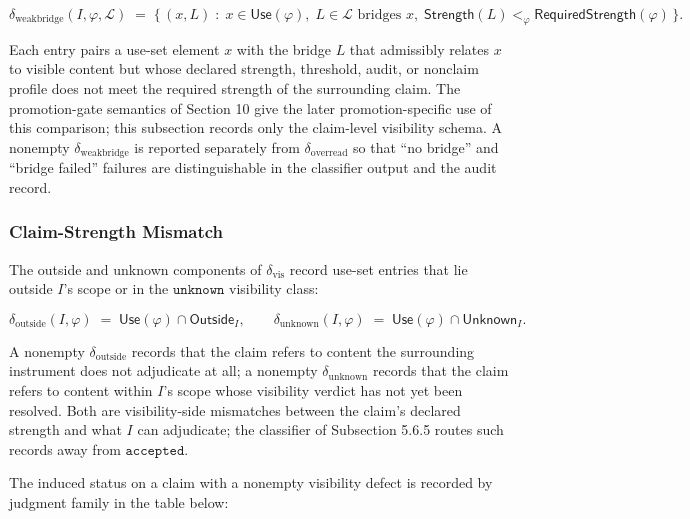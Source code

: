 \documentclass[11pt]{article}
\theoremstyle{definition}
\begin{document}
\[
\delta_{\mathrm{weakbridge}}(I,\varphi,\mathcal L)\;=\;\{\,(x,L)\;:\;x\in\mathsf{Use}(\varphi),\;L\in\mathcal L\text{ bridges }x,\;\mathsf{Strength}(L)<_{\varphi}\mathsf{RequiredStrength}(\varphi)\,\}.
\]

Each entry pairs a use-set element \(x\) with the bridge \(L\) that admissibly relates \(x\) to visible content but whose declared strength, threshold, audit, or nonclaim profile does not meet the required strength of the surrounding claim. The promotion-gate semantics of Section 10 give the later promotion-specific use of this comparison; this subsection records only the claim-level visibility schema. A nonempty \(\delta_{\mathrm{weakbridge}}\) is reported separately from \(\delta_{\mathrm{overread}}\) so that ``no bridge'' and ``bridge failed'' failures are distinguishable in the classifier output and the audit record.

\subsubsection{Claim-Strength Mismatch}

The outside and unknown components of \(\delta_{\mathrm{vis}}\) record use-set entries that lie outside \(I\)'s scope or in the \(\texttt{unknown}\) visibility class:

\[
\delta_{\mathrm{outside}}(I,\varphi)\;=\;\mathsf{Use}(\varphi)\cap\mathsf{Outside}_I,\qquad \delta_{\mathrm{unknown}}(I,\varphi)\;=\;\mathsf{Use}(\varphi)\cap\mathsf{Unknown}_I.
\]

A nonempty \(\delta_{\mathrm{outside}}\) records that the claim refers to content the surrounding instrument does not adjudicate at all; a nonempty \(\delta_{\mathrm{unknown}}\) records that the claim refers to content within \(I\)'s scope whose visibility verdict has not yet been resolved. Both are visibility-side mismatches between the claim's declared strength and what \(I\) can adjudicate; the classifier of Subsection 5.6.5 routes such records away from \(\texttt{accepted}\).

The induced status on a claim with a nonempty visibility defect is recorded by judgment family in the table below:
\end{document}
